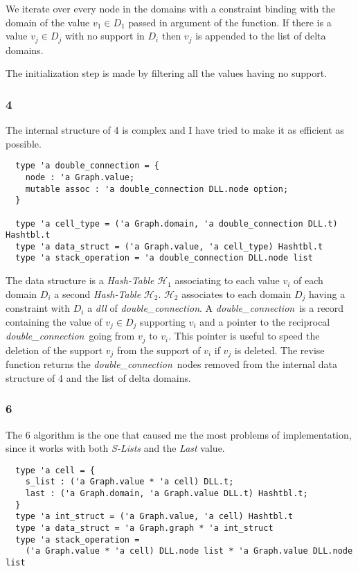 \documentclass{rapport}
\begin{document}
We iterate over every node in the domains with a constraint binding with the domain of the value $v_1 \in D_1$ passed in argument of the function. If there is a value $v_j \in D_j$ with no support in $D_i$ then $v_j$ is appended to the list of delta domains.

The initialization step is made by filtering all the values having no support.

\subsubsection{\ac{4}}

The internal structure of \ac{4} is complex and I have tried to make it as efficient as possible.

\begin{verbatim}
  type 'a double_connection = {
    node : 'a Graph.value;
    mutable assoc : 'a double_connection DLL.node option;
  }

  type 'a cell_type = ('a Graph.domain, 'a double_connection DLL.t) Hashtbl.t
  type 'a data_struct = ('a Graph.value, 'a cell_type) Hashtbl.t
  type 'a stack_operation = 'a double_connection DLL.node list
\end{verbatim}

\def\dc{\textit{double\_connection}}
\def\ds{\textit{data\_struct}}

The data structure is a \textit{Hash-Table} $\mathcal{H}_1$ associating to each value $v_i$ of each domain $D_i$ a second \textit{Hash-Table} $\mathcal{H}_2$. $\mathcal{H}_2$ associates to each domain $D_j$ having a constraint with $D_i$ a \textit{dll} of \dc. A \dc\ is a record containing the value of $v_j \in D_j$ supporting $v_i$ and a pointer to the reciprocal \dc\ going from $v_j$ to $v_i$. This pointer is useful to speed the deletion of the support $v_j$ from the support of $v_i$ if $v_j$ is deleted. The revise function returns the \dc\ nodes removed from the internal data structure of \ac{4} and the list of delta domains.

\subsubsection{\ac{6}}

The \ac{6} algorithm is the one that caused me the most problems of implementation, since it works with both \textit{S-Lists} and the \textit{Last} value.

\begin{verbatim}
  type 'a cell = {
    s_list : ('a Graph.value * 'a cell) DLL.t;
    last : ('a Graph.domain, 'a Graph.value DLL.t) Hashtbl.t;
  }
  type 'a int_struct = ('a Graph.value, 'a cell) Hashtbl.t
  type 'a data_struct = 'a Graph.graph * 'a int_struct
  type 'a stack_operation =
    ('a Graph.value * 'a cell) DLL.node list * 'a Graph.value DLL.node list
\end{verbatim}
\end{document}
